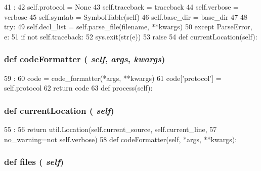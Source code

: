 \begin{DoxyCode}
41                                                                                  
         :
42         self.protocol = None
43         self.traceback = traceback
44         self.verbose = verbose
45         self.symtab = SymbolTable(self)
46         self.base_dir = base_dir
47 
48         try:
49             self.decl_list = self.parse_file(filename, **kwargs)
50         except ParseError, e:
51             if not self.traceback:
52                 sys.exit(str(e))
53             raise
54 
    def currentLocation(self):
\end{DoxyCode}
\hypertarget{classslicc_1_1parser_1_1SLICC_a68362f78121a5495eaa849608e1bed7a}{
\subsubsection[{codeFormatter}]{\setlength{\rightskip}{0pt plus 5cm}def codeFormatter ( {\em self}, \/   {\em args}, \/   {\em kwargs})}}
\label{classslicc_1_1parser_1_1SLICC_a68362f78121a5495eaa849608e1bed7a}



\begin{DoxyCode}
59                                             :
60         code = code_formatter(*args, **kwargs)
61         code['protocol'] = self.protocol
62         return code
63 
    def process(self):
\end{DoxyCode}
\hypertarget{classslicc_1_1parser_1_1SLICC_a9edcf93d83265ddad0112028dc4feded}{
\subsubsection[{currentLocation}]{\setlength{\rightskip}{0pt plus 5cm}def currentLocation ( {\em self})}}
\label{classslicc_1_1parser_1_1SLICC_a9edcf93d83265ddad0112028dc4feded}



\begin{DoxyCode}
55                              :
56         return util.Location(self.current_source, self.current_line,
57                              no_warning=not self.verbose)
58 
    def codeFormatter(self, *args, **kwargs):
\end{DoxyCode}
\hypertarget{classslicc_1_1parser_1_1SLICC_a35b1a87f6fcbddeb5b793b0e415765f8}{
\subsubsection[{files}]{\setlength{\rightskip}{0pt plus 5cm}def files ( {\em self})}}
\label{classslicc_1_1parser_1_1SLICC_a35b1a87f6fcbddeb5b793b0e415765f8}



